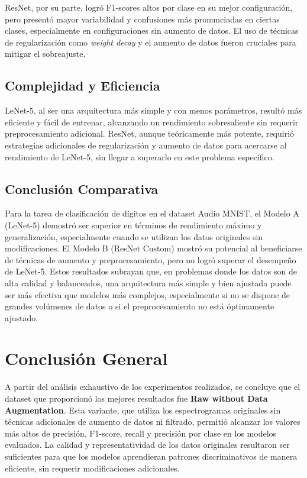 \documentclass[conference]{IEEEtran}
\begin{document}
ResNet, por su parte, logró F1-scores altos por clase en su mejor configuración, pero presentó mayor variabilidad y confusiones más pronunciadas en ciertas clases, especialmente en configuraciones sin aumento de datos. El uso de técnicas de regularización como \textit{weight decay} y el aumento de datos fueron cruciales para mitigar el sobreajuste.

\subsection{Complejidad y Eficiencia}

LeNet-5, al ser una arquitectura más simple y con menos parámetros, resultó más eficiente y fácil de entrenar, alcanzando un rendimiento sobresaliente sin requerir preprocesamiento adicional. ResNet, aunque teóricamente más potente, requirió estrategias adicionales de regularización y aumento de datos para acercarse al rendimiento de LeNet-5, sin llegar a superarlo en este problema específico.

\subsection{Conclusión Comparativa}

Para la tarea de clasificación de dígitos en el dataset Audio MNIST, el Modelo A (LeNet-5) demostró ser superior en términos de rendimiento máximo y generalización, especialmente cuando se utilizan los datos originales sin modificaciones. El Modelo B (ResNet Custom) mostró su potencial al beneficiarse de técnicas de aumento y preprocesamiento, pero no logró superar el desempeño de LeNet-5. Estos resultados subrayan que, en problemas donde los datos son de alta calidad y balanceados, una arquitectura más simple y bien ajustada puede ser más efectiva que modelos más complejos, especialmente si no se dispone de grandes volúmenes de datos o si el preprocesamiento no está óptimamente ajustado.

\section{Conclusión General}

A partir del análisis exhaustivo de los experimentos realizados, se concluye que el dataset que proporcionó los mejores resultados fue \textbf{Raw without Data Augmentation}. Esta variante, que utiliza los espectrogramas originales sin técnicas adicionales de aumento de datos ni filtrado, permitió alcanzar los valores más altos de precisión, F1-score, recall y precisión por clase en los modelos evaluados. La calidad y representatividad de los datos originales resultaron ser suficientes para que los modelos aprendieran patrones discriminativos de manera eficiente, sin requerir modificaciones adicionales.
\end{document}
